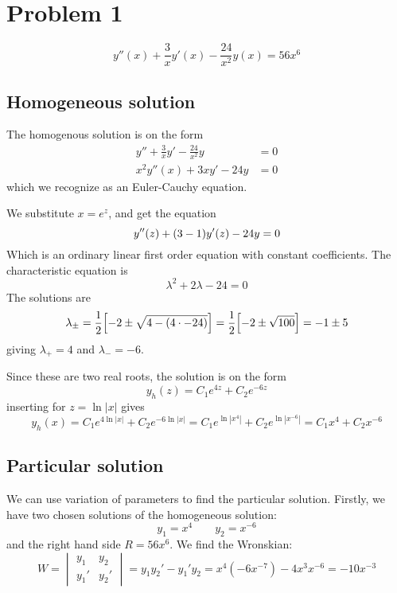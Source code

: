 \documentclass[10pt,a4paper]{article}
\renewcommand{\exp}{e^}
\begin{document}
\section*{Problem 1}
\begin{equation}
    y''(x) + \frac{3}{x}y'(x) - \frac{24}{x^2}y(x) = 56x^6
\end{equation}

\subsection*{Homogeneous solution}
The homogenous solution is on the form
\begin{align}
    y'' + \frac{3}{x}y' - \frac{24}{x^2}y &= 0 \\
    x^2 y''(x) + 3xy' - 24y &= 0
\end{align}
which we recognize as an Euler-Cauchy equation.

We substitute $x = \exp{z}$, and get the equation
\begin{equation}
    y''(z) + (3-1)y'(z) - 24y = 0 \\
\end{equation}
Which is an ordinary linear first order equation with constant coefficients. The characteristic equation is
\begin{equation}
    \lambda^2 + 2\lambda - 24 = 0
\end{equation}
The solutions are
\begin{equation}
    \lambda_\pm = \frac{1}{2}\qty[-2 \pm \sqrt{4-(4\cdot-24)} ] = \frac{1}{2}\qty[-2\pm \sqrt{100}] = -1\pm 5
\end{equation}
giving $\lambda_+ = 4$ and $\lambda_- = -6$.

Since these are two real roots, the solution is on the form
\begin{equation}
    y_h(z) = C_1\exp{4z} + C_2\exp{-6z}
\end{equation}
inserting for $z = \ln|x|$ gives
\begin{equation}
    y_h(x) = C_1\exp{4\ln|x|} + C_2\exp{-6\ln|x|} = C_1\exp{\ln|x^4|} + C_2\exp{\ln|x^{-6}|} = C_1 x^4 + C_2 x^{-6}
\end{equation}



\subsection*{Particular solution}
We can use variation of parameters to find the particular solution. Firstly, we have two chosen solutions of the homogeneous solution:
\begin{equation}
    y_1 = x^4 \quad\quad y_2 = x^{-6}
\end{equation}
and the right hand side $R = 56x^6$. We find the Wronskian:
\begin{equation}
    W = \begin{vmatrix} y_1 & y_2 \\ y_1' & y_2' \end{vmatrix} = y_1 y_2' - y_1'y_2 = x^4(-6x^{-7}) - 4x^3 x^{-6} = -10x^{-3}
\end{equation}
\end{document}
